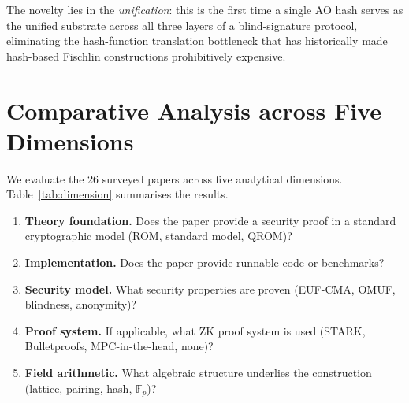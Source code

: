 \documentclass[11pt,a4paper]{article}
\newcommand{\Fp}{\mathbb{F}_p}
\begin{document}
The novelty lies in the \emph{unification}: this is the first time a single AO hash serves
as the unified substrate across all three layers of a blind-signature protocol, eliminating the
hash-function translation bottleneck that has historically made hash-based Fischlin constructions
prohibitively expensive.

\section{Comparative Analysis across Five Dimensions}
\label{sec:analysis}

We evaluate the 26 surveyed papers across five analytical dimensions.  Table~\ref{tab:dimension}
summarises the results.

\begin{enumerate}[label=\textbf{D\arabic*.},leftmargin=*]
  \item \textbf{Theory foundation.}  Does the paper provide a security proof in a standard
        cryptographic model (ROM, standard model, QROM)?
  \item \textbf{Implementation.}  Does the paper provide runnable code or benchmarks?
  \item \textbf{Security model.}  What security properties are proven (EUF-CMA, OMUF,
        blindness, anonymity)?
  \item \textbf{Proof system.}  If applicable, what ZK proof system is used (STARK,
        Bulletproofs, MPC-in-the-head, none)?
  \item \textbf{Field arithmetic.}  What algebraic structure underlies the construction
        (lattice, pairing, hash, $\Fp$)?
\end{enumerate}
\end{document}
